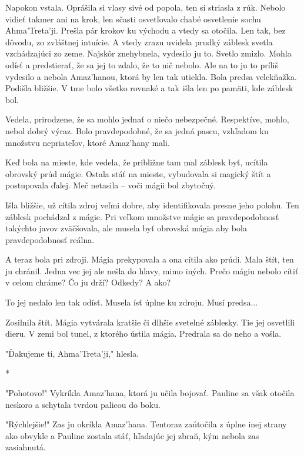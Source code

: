 \documentclass{book}
\begin{document}
Napokon vstala. Oprášila si vlasy sivé od popola, ten si striasla z rúk. Nebolo vidieť takmer ani na krok, len sčasti osvetľovalo chabé osvetlenie sochu Ahma'Treta'ji. Prešla pár krokov ku východu a vtedy sa otočila. Len tak, bez dôvodu, zo zvláštnej intuície. A vtedy zrazu uvidela prudký záblesk svetla vzchádzajúci zo zeme. Najskôr znehybnela, vydesilo ju to. Svetlo zmizlo. Mohla odísť a predstierať, že sa jej to zdalo, že to nič nebolo. Ale na to ju to príliš vydesilo a nebola Amaz'hanou, ktorá by len tak utiekla. Bola predsa velekňažka. Podišla bližšie. V tme bolo všetko rovnaké a tak išla len po pamäti, kde záblesk bol.

Vedela, prirodzene, že sa mohlo jednať o niečo nebezpečné. Respektíve, mohlo, nebol dobrý výraz. Bolo pravdepodobné, že sa jedná pascu, vzhľadom ku množstvu nepriateľov, ktoré Amaz'hany mali.

Keď bola na mieste, kde vedela, že približne tam mal záblesk byť, ucítila obrovský prúd mágie. Ostala stáť na mieste, vybudovala si magický štít a postupovala ďalej. Meč netasila – voči mágii bol zbytočný.

Išla bližšie, už cítila zdroj veľmi dobre, aby identifikovala presne jeho polohu. Ten záblesk pochádzal z mágie. Pri veľkom množstve mágie sa pravdepodobnosť takýchto javov zväčšovala, ale musela byť obrovská mágia aby bola pravdepodobnosť reálna.

A teraz bola pri zdroji. Mágia prekypovala a ona cítila ako prúdi. Mala štít, ten ju chránil. Jedna vec jej ale nešla do hlavy, mimo iných. Prečo mágiu nebolo cítiť v celom chráme? Čo ju drží? Odkedy? A ako?

To jej nedalo len tak odísť. Musela ísť úplne ku zdroju. Musí predsa...

Zosilnila štít. Mágia vytvárala kratšie či dlhšie svetelné záblesky. Tie jej osvetlili dieru. V zemi bol tunel, z ktorého ústila mágia. Predrala sa do neho a vošla.

"$ $Ďakujeme ti, Ahma'Treta'ji,"$ $ hlesla.

\begin{center}
*
\end{center}

"$ $Pohotovo!"$ $ Vykríkla Amaz'hana, ktorá ju učila bojovať. Pauline sa však otočila neskoro a schytala tvrdou palicou do boku.

"$ $Rýchlejšie!"$ $ Zas ju okríkla Amaz'hana. Tentoraz zaútočila z úplne inej strany ako obvykle a Pauline zostala stáť, hľadajúc jej zbraň, kým nebola zas zasiahnutá.
\end{document}
